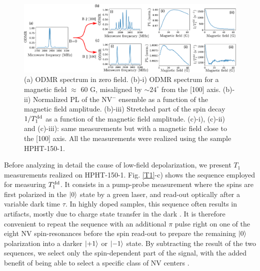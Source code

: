 \documentclass[preprintnumbers,amsmath,amssymb,superscriptaddress,twocolumn,showpacs]{revtex4-2}
\begin{document}
\begin{figure}
\includegraphics[width=.95\textwidth]{fig_100_vs_1x1x1x1.pdf}
\caption{(a) ODMR spectrum in zero field. (b)-i) ODMR spectrum for a magnetic field $\approx$ 60 G, misaligned by $\sim  24^\circ$ from the [100] axis. (b)-ii) Normalized PL of the NV$^-$ ensemble as a function of the magnetic field amplitude. (b)-iii) Stretched part of the spin decay $1/T_1^{\rm dd}$ as a function of the magnetic field amplitude. (c)-i), (c)-ii) and (c)-iii): same measurements but with a magnetic field close to the [100] axis. All the measurements were realized using the sample HPHT-150-1. }
\label{100_VS_1x4}
\end{figure}

Before analyzing in detail the cause of low-field depolarization, we present $T_1$ measurements realized on HPHT-150-1. Fig. \ref{T1}-c) shows the sequence employed for measuring $T_1^{\rm dd}$. 
It consists in a pump-probe measurement where the spins are first polarized in the $\ket{0}$ state by a green laser, and read-out optically after a variable dark time $\tau$. In highly doped samples, this sequence often results in artifacts, mostly due to charge state transfer in the dark \citep{giri_coupled_2018, giri_selective_2019}. It is therefore convenient to repeat the sequence with an additional $\pi$ pulse right on one of the eight NV spin-resonances before the spin read-out to prepare the remaining $\ket{0}$ polarization into a darker $\ket{+1}$ or $\ket{-1}$ state. By subtracting the result of the two sequences, we select only the spin-dependent part of the signal, with the added benefit of being able to select a specific class of NV centers \citep{jarmola_temperature-_2012, mrozek_longitudinal_2015, choi2017depolarization}. 
\end{document}
